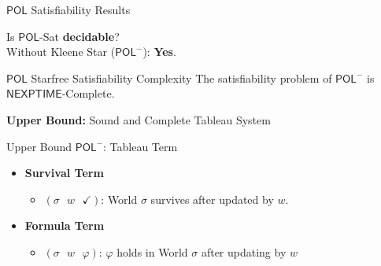 \documentclass[usenames,dvipsnames]{beamer}
\newcommand{\M}{\mathcal{M}}
\newcommand{\POL}{\mathsf{POL}}
\begin{document}
\newcommand{\NEXPTIME}{\mathsf{NEXPTIME}}

\begin{frame}{$\POL$ Satisfiability Results}
     \begin{figure}
        \centering
    \end{figure}\pause
    Is $\POL$-Sat \textbf{decidable}?\\\pause
    Without Kleene Star ($\POL^-$): \textbf{Yes}.
    \begin{block}{$\POL$ Starfree Satisfiability Complexity}
        The satisfiability problem of $\POL^-$ is $\NEXPTIME$-Complete.
    \end{block}\pause

    \textbf{Upper Bound:} Sound and Complete Tableau System
\end{frame}

\begin{frame}{Upper Bound $\POL^-$: Tableau Term}
    \begin{itemize}
    \setlength\itemsep{4em}
        \item<1-> \textbf{Survival Term}
        \begin{itemize}
            \item<2-> \textbf{$(\sigma~~~w~~~\checkmark)$}: World $\sigma$ survives after updated by $w$.
        \end{itemize}

        \item<3-> \textbf{Formula Term}
        \begin{itemize}
            \item<4->  \textbf{$(\sigma~~~w~~~\varphi)$}: $\varphi$ holds in World $\sigma$ after updating by $w$ 
        \end{itemize}
    \end{itemize}
\end{frame}
\end{document}
